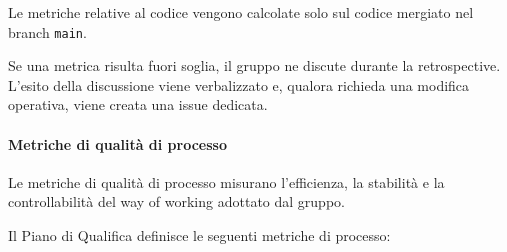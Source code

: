 Le metriche relative al codice vengono calcolate solo sul codice mergiato nel
branch \texttt{main}.

Se una metrica risulta fuori soglia, il gruppo ne discute durante la retrospective.
L'esito della discussione viene verbalizzato e, qualora richieda una modifica
operativa, viene creata una issue dedicata.

\paragraph{Metriche di qualità di processo}

Le metriche di qualità di processo misurano l'efficienza, la stabilità e la
controllabilità del way of working adottato dal gruppo.

Il Piano di Qualifica definisce le seguenti metriche di processo:

